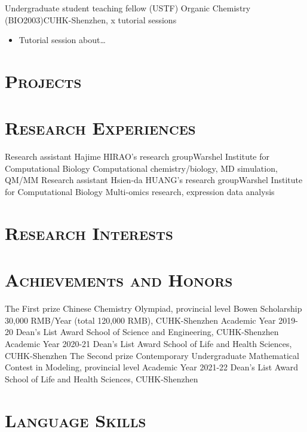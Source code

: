 \documentclass[11pt,a4paper]{moderncv}
\newcommand{\cvsection}[1]{\section{\textsc{#1}}}
\begin{document}
        {Undergraduate student teaching fellow (USTF)}{}
        {Organic Chemistry (BIO2003)}{CUHK-Shenzhen, x tutorial sessions}
        {
                \begin{itemize}
                    \item Tutorial session about\dots
                \end{itemize}
        }

\cvsection{Projects}

\cvsection{Research Experiences}
        {Research assistant}{}
        {Hajime HIRAO's research group}{Warshel Institute
        for Computational Biology}
        {Computational chemistry/biology, MD simulation, QM/MM}
        {Research assistant}{}
        {Hsien-da HUANG's research group}{Warshel Institute
        for Computational Biology}
        {Multi-omics research, expression data analysis}


\cvsection{Research Interests}

\cvsection{Achievements and Honors}
        {The First prize}{}
        {Chinese Chemistry Olympiad, provincial level}{}
        {}
        {Bowen Scholarship}{}
        {30,000 RMB/Year (total 120,000 RMB), CUHK-Shenzhen}{}
        {}
        {Academic Year 2019-20 Dean's List Award}{}
        {School of Science and Engineering, CUHK-Shenzhen}{}
        {}
        {Academic Year 2020-21 Dean's List Award}{}
        {School of Life and Health Sciences, CUHK-Shenzhen}{}
        {}
        {The Second prize}{}
        {Contemporary Undergraduate Mathematical Contest in Modeling, provincial level}{}
        {}
        {Academic Year 2021-22 Dean's List Award}{}
        {School of Life and Health Sciences, CUHK-Shenzhen}{}
        {}

\cvsection{Language Skills}

\end{document}
